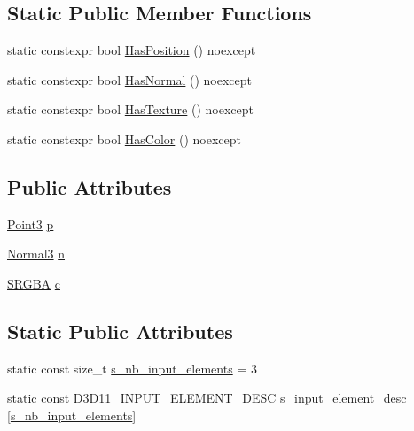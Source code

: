 \subsection*{Static Public Member Functions}
\begin{DoxyCompactItemize}
\item 
static constexpr bool \hyperlink{structmage_1_1_vertex_position_normal_color_ae5e4ff514524b532f8c148a2f7e2cf8d}{Has\+Position} () noexcept
\item 
static constexpr bool \hyperlink{structmage_1_1_vertex_position_normal_color_a89924fd28326ffbe05b3b096f713937d}{Has\+Normal} () noexcept
\item 
static constexpr bool \hyperlink{structmage_1_1_vertex_position_normal_color_a9939ce4300e6dd0402abd299f55435ef}{Has\+Texture} () noexcept
\item 
static constexpr bool \hyperlink{structmage_1_1_vertex_position_normal_color_ab59f21c8f7ae5cef563365fc9b7d34c7}{Has\+Color} () noexcept
\end{DoxyCompactItemize}
\subsection*{Public Attributes}
\begin{DoxyCompactItemize}
\item 
\hyperlink{structmage_1_1_point3}{Point3} \hyperlink{structmage_1_1_vertex_position_normal_color_a6847c367ca68fb8d8e349c8441ae63dd}{p}
\item 
\hyperlink{structmage_1_1_normal3}{Normal3} \hyperlink{structmage_1_1_vertex_position_normal_color_a771c7e71e8b6441b73f513f511507650}{n}
\item 
\hyperlink{structmage_1_1_s_r_g_b_a}{S\+R\+G\+BA} \hyperlink{structmage_1_1_vertex_position_normal_color_a32876d6ab674130330651f9fa3daabd0}{c}
\end{DoxyCompactItemize}
\subsection*{Static Public Attributes}
\begin{DoxyCompactItemize}
\item 
static const size\+\_\+t \hyperlink{structmage_1_1_vertex_position_normal_color_ac370f25c8a65c6ed0522b84710acd713}{s\+\_\+nb\+\_\+input\+\_\+elements} = 3
\item 
static const D3\+D11\+\_\+\+I\+N\+P\+U\+T\+\_\+\+E\+L\+E\+M\+E\+N\+T\+\_\+\+D\+E\+SC \hyperlink{structmage_1_1_vertex_position_normal_color_a1d14ae159608683093a33b38fb6259e4}{s\+\_\+input\+\_\+element\+\_\+desc} \mbox{[}\hyperlink{structmage_1_1_vertex_position_normal_color_ac370f25c8a65c6ed0522b84710acd713}{s\+\_\+nb\+\_\+input\+\_\+elements}\mbox{]}
\end{DoxyCompactItemize}


